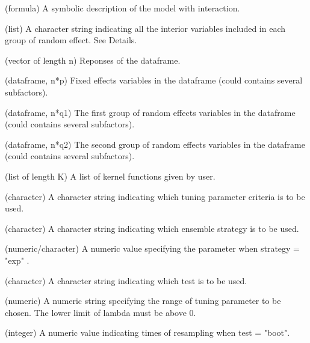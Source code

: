 \documentclass[a4paper]{book}
\begin{document}
%
\begin{Arguments}
\begin{ldescription}
\item[\code{formula\_int}] (formula) A symbolic description of the model with
interaction.

\item[\code{label\_names}] (list) A character string indicating all the interior
variables included in each group of random effect. See Details.

\item[\code{Y}] (vector of length n) Reponses of the dataframe.

\item[\code{X}] (dataframe, n*p) Fixed effects variables in the dataframe (could
contains several subfactors).

\item[\code{Z1}] (dataframe, n*q1) The first group of random effects variables in
the dataframe (could contains several subfactors).

\item[\code{Z2}] (dataframe, n*q2) The second group of random effects variables in
the dataframe (could contains several subfactors).

\item[\code{kern\_list}] (list of length K) A list of kernel functions given by
user.

\item[\code{mode}] (character) A character string indicating which tuning parameter
criteria is to be used.

\item[\code{strategy}] (character) A character string indicating which ensemble
strategy is to be used.

\item[\code{beta\_exp}] (numeric/character) A numeric value specifying the parameter
when strategy = "exp" .

\item[\code{test}] (character) A character string indicating which test is to be
used.

\item[\code{lambda}] (numeric) A numeric string specifying the range of tuning parameter 
to be chosen. The lower limit of lambda must be above 0.

\item[\code{B}] (integer) A numeric value indicating times of resampling when test
= "boot".
\end{ldescription}
\end{Arguments}
\end{document}
